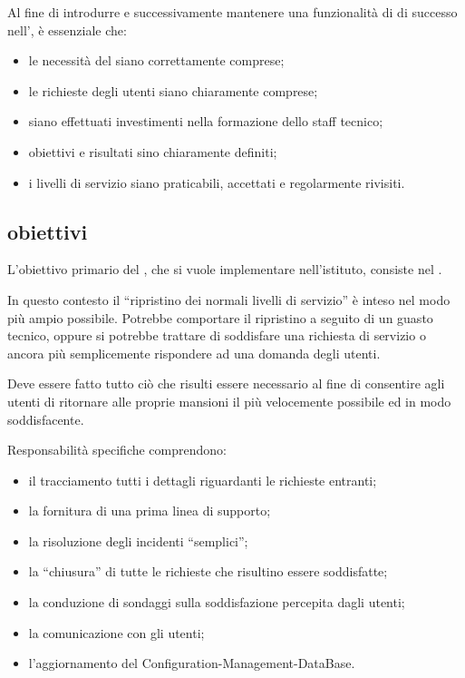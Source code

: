 Al fine di introdurre e successivamente mantenere una funzionalità di  di successo nell'\entity{}, è essenziale che:

\begin{itemize}
\item{le necessità del  siano correttamente comprese;}
\item{le richieste degli utenti siano chiaramente comprese;}
\item{siano effettuati investimenti nella formazione dello staff tecnico;}
\item{obiettivi e risultati sino chiaramente definiti;}
\item{i livelli di servizio siano praticabili, accettati e regolarmente rivisiti.}
\end{itemize}

\subsection[Obiettivi]{obiettivi}
\label{sd-objectives}
L'obiettivo primario del , che si vuole implementare nell'istituto, consiste nel . 

In questo contesto il ``ripristino dei normali livelli di servizio'' è inteso nel modo più ampio possibile. Potrebbe comportare il ripristino a seguito di un guasto tecnico, oppure si potrebbe trattare di soddisfare una richiesta di servizio o ancora più semplicemente rispondere ad una domanda degli utenti. 

Deve essere fatto tutto ciò che risulti essere necessario al fine di consentire agli utenti di ritornare alle proprie mansioni il più velocemente possibile ed in modo soddisfacente.

Responsabilità specifiche comprendono:

\begin{itemize}
\item{il tracciamento tutti i dettagli riguardanti le richieste entranti;}
\item{la fornitura di una prima linea di supporto;}
\item{la risoluzione degli incidenti ``semplici'';}
\item{la ``chiusura'' di tutte le richieste che risultino essere soddisfatte;}
\item{la conduzione di sondaggi sulla soddisfazione percepita dagli utenti;}
\item{la comunicazione con gli utenti;}
\item{l'aggiornamento del \acf{Configuration-Management-DataBase}.}
\end{itemize}